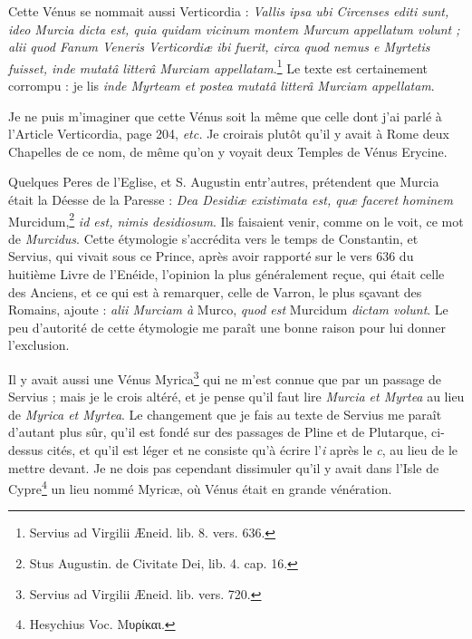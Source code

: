 \documentclass[a4paper, 18pt, oneside]{article}
\begin{document}
Cette Vénus se nommait aussi Verticordia : \emph{Vallis ipsa ubi Circenses editi sunt, ideo Murcia dicta est, quia quidam vicinum montem Murcum appellatum volunt ; alii quod Fanum Veneris Verticordiæ ibi fuerit, circa quod nemus e Myrtetis fuisset, inde mutatâ litterâ Murciam appellatam}.\footnote{Servius ad Virgilii Æneid. lib. 8. vers. 636.} Le texte est certainement corrompu : je lis \emph{inde Myrteam et postea mutatâ litterâ Murciam appellatam}.

Je ne puis m'imaginer que cette Vénus soit la même que celle dont j'ai parlé à l'Article Verticordia, page 204, \emph{etc.} Je croirais plutôt qu'il y avait à Rome deux Chapelles de ce nom, de même qu'on y voyait deux Temples de Vénus Erycine.

Quelques Peres de l'Eglise, et S. Augustin entr'autres, prétendent que Murcia était la Déesse de la Paresse : \emph{Dea Desidiæ existimata est, quæ faceret hominem} Murcidum,\footnote{Stus Augustin. de Civitate Dei, lib. 4. cap. 16.} \emph{id est, nimis desidiosum}. Ils faisaient venir, comme on le voit, ce mot de \emph{Murcidus}. Cette étymologie s'accrédita vers le temps de Constantin, et Servius, qui vivait sous ce Prince, après avoir rapporté sur le vers 636 du huitième Livre de l'Enéide, l'opinion la plus généralement reçue, qui était celle des Anciens, et ce qui est à remarquer, celle de Varron, le plus sçavant des Romains, ajoute : \emph{alii Murciam à} Murco, \emph{quod est} Murcidum \emph{dictam volunt}. Le peu d'autorité de cette étymologie me paraît une bonne raison pour lui donner l'exclusion.

Il y avait aussi une Vénus Myrica\footnote{Servius ad Virgilii Æneid. lib. vers. 720.} qui ne m'est connue que par un passage de Servius ; mais je le crois altéré, et je pense qu'il faut lire \emph{Murcia et Myrtea} au lieu de \emph{Myrica et Myrtea}. Le changement que je fais au texte de Servius me paraît d'autant plus sûr, qu'il est fondé sur des passages de Pline et de Plutarque, ci-dessus cités, et qu'il est léger et ne consiste qu'à écrire l'\emph{i} après le \emph{c}, au lieu de le mettre devant. Je ne dois pas cependant dissimuler qu'il y avait dans l'Isle de Cypre\footnote{Hesychius Voc. Μυρίκαι.} un lieu nommé Myricæ, où Vénus était en grande vénération.
\end{document}
